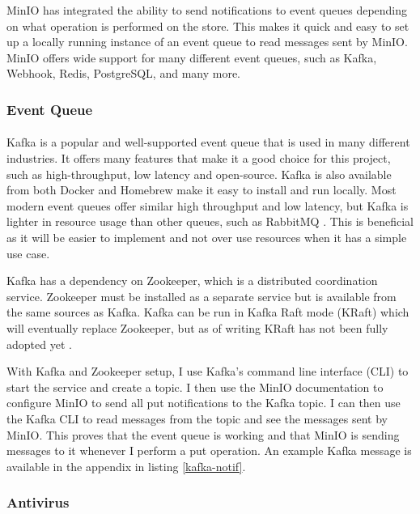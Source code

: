 \documentclass[12pt, conference, final, a4paper, onecolumn, compsoc]{IEEEtran}
\begin{document}
MinIO has integrated the ability to send notifications to event queues depending
on what operation is performed on the store. This makes it quick and easy to set
up a locally running instance of an event queue to read messages sent by MinIO.
MinIO offers wide support for many different event queues, such as Kafka,
Webhook, Redis, PostgreSQL, and many more.

\subsubsection*{Event Queue}
\paragraph{}

Kafka is a popular and well-supported event queue that is used in many different
industries. It offers many features that make it a good choice for this project,
such as high-throughput, low latency and open-source. Kafka is also available
from both Docker and Homebrew make it easy to install and run locally. Most
modern event queues offer similar high throughput and low latency, but Kafka is
lighter in resource usage than other queues, such as RabbitMQ
\citep{kafka-rabbitmq}. This is beneficial as it will be easier to implement and
not over use resources when it has a simple use case.

Kafka has a dependency on Zookeeper, which is a distributed coordination
service. Zookeeper must be installed as a separate service but is available from
the same sources as Kafka. Kafka can be run in Kafka Raft mode (KRaft) which
will eventually replace Zookeeper, but as of writing KRaft has not been fully
adopted yet \citep{kafka-raft}.

With Kafka and Zookeeper setup, I use Kafka's command line interface (CLI) to
start the service and create a topic. I then use the MinIO documentation to
configure MinIO to send all put notifications to the Kafka topic. I can then use
the Kafka CLI to read messages from the topic and see the messages sent by
MinIO. This proves that the event queue is working and that MinIO is sending
messages to it whenever I perform a put operation. An example Kafka message is
available in the appendix in listing \ref{kafka-notif}.


\subsubsection*{Antivirus}
\end{document}
